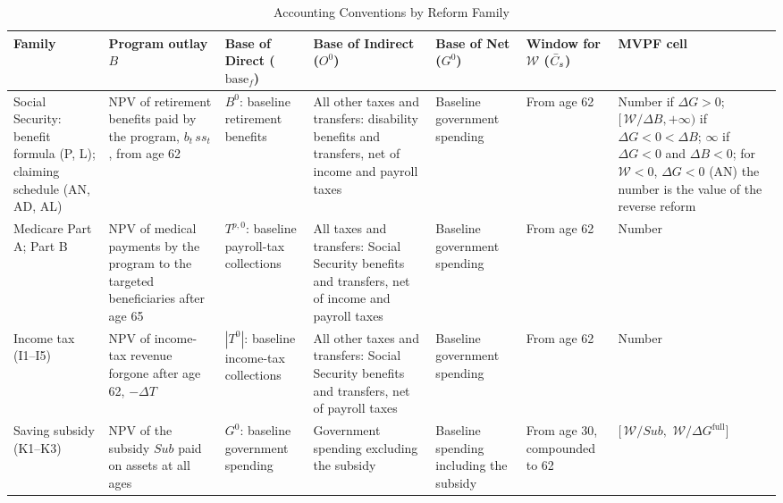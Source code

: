 \begin{table}[!t]
\centering
\caption{Accounting Conventions by Reform Family}
\label{tab:conventions}
\vspace{6pt}
\scriptsize
\setlength{\tabcolsep}{3pt}
\renewcommand{\arraystretch}{1.0}
\begin{threeparttable}
\begin{tabular}{@{}>{\raggedright\arraybackslash}p{0.85in}>{\raggedright\arraybackslash}p{1.05in}>{\raggedright\arraybackslash}p{0.8in}>{\raggedright\arraybackslash}p{0.9in}>{\raggedright\arraybackslash}p{0.7in}>{\raggedright\arraybackslash}p{0.55in}>{\raggedright\arraybackslash}p{1.15in}@{}}
\toprule
Family & Program outlay $B$ & Base of Direct ($\text{base}_f$) & Base of Indirect ($O^{0}$) & Base of Net ($G^{0}$) & Window for $\mathcal{W}$ ($\bar{C}_{s}$) & MVPF cell \\
\midrule
Social Security: benefit formula (P, L); claiming schedule (AN, AD, AL)
 & NPV of retirement benefits paid by the program, $b_t\,ss_t$, from age 62
 & $B^{0}$: baseline retirement benefits
 & All other taxes and transfers: disability benefits and transfers, net of income and payroll taxes
 & Baseline government spending
 & From age 62
 & Number if $\Delta G>0$; $[\,\mathcal{W}/\Delta B,+\infty)$ if $\Delta G<0<\Delta B$; $\infty$ if $\Delta G<0$ and $\Delta B<0$; for $\mathcal{W}<0$, $\Delta G<0$ (AN) the number is the value of the reverse reform \\
\addlinespace
Medicare Part A; Part B
 & NPV of medical payments by the program to the targeted beneficiaries after age 65
 & $T^{p,0}$: baseline payroll-tax collections
 & All taxes and transfers: Social Security benefits and transfers, net of income and payroll taxes
 & Baseline government spending
 & From age 62
 & Number \\
\addlinespace
Income tax (I1--I5)
 & NPV of income-tax revenue forgone after age 62, $-\Delta T$
 & $|T^{0}|$: baseline income-tax collections
 & All other taxes and transfers: Social Security benefits and transfers, net of payroll taxes
 & Baseline government spending
 & From age 62
 & Number \\
\addlinespace
Saving subsidy (K1--K3)
 & NPV of the subsidy $\mathit{Sub}$ paid on assets at all ages
 & $G^{0}$: baseline government spending
 & Government spending excluding the subsidy
 & Baseline spending including the subsidy
 & From age 30, compounded to 62
 & $[\,\mathcal{W}/\mathit{Sub},$ $\mathcal{W}/\Delta G^{\mathrm{full}}]$ \\
\bottomrule
\end{tabular}

\end{threeparttable}
\end{table}
